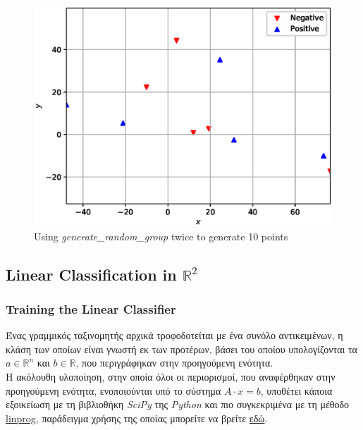 \documentclass[12pt]{article}
\newcommand{\R}{\mathbb{R}}
\newenvironment{matlab}
	{\begin{figure}[H]\centering\captionsetup{justification=centering}}
	{\end{figure}}
\begin{document}
\begin{matlab}
    \includegraphics[scale=0.75]{figures/random}
    \caption{Using \textit{generate\_random\_group} twice to generate 10 points }
\end{matlab}

\pagebreak

\subsection{Linear Classification in \( \R^2 \)}

\subsubsection{Training the Linear Classifier}

Ένας γραμμικός ταξινομητής αρχικά τροφοδοτείται με ένα συνόλο αντικειμένων,
η κλάση των οποίων είναι γνωστή εκ των προτέρων,
βάσει του οποίου υπολογίζονται τα \( a \in \R^{n} \) και \( b \in \R \),
που περιγράφηκαν στην προηγούμενη ενότητα. \\

Η ακόλουθη υλοποίηση, στην οποία όλοι οι περιορισμοί,
που αναφέρθηκαν στην προηγούμενη ενότητα, ενοποιούνται υπό το σύστημα \( Α \cdot x = b \),
υποθέτει κάποια εξοικείωση με τη βιβλιοθήκη \textit{SciPy} της \textit{Python}
και πιο συγκεκριμένα με τη μέθοδο
\href{https://docs.scipy.org/doc/scipy/reference/optimize.linprog-simplex.html}{linprog},
παράδειγμα χρήσης της οποίας μπορείτε να βρείτε
\href{https://stackoverflow.com/questions/45873783/python-linprog-minimization-simplex-method}{εδώ}. \\
\end{document}
